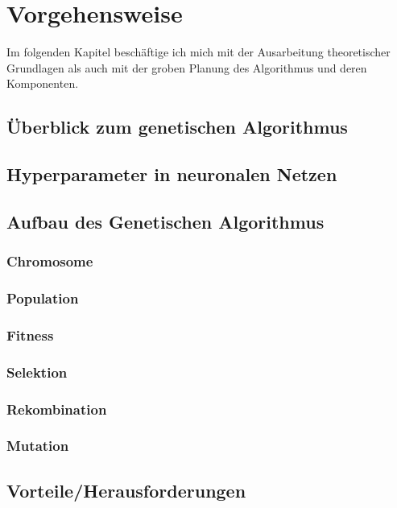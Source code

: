 \chapter{Vorgehensweise} 
Im folgenden Kapitel beschäftige ich mich mit der Ausarbeitung theoretischer Grundlagen als auch mit der groben Planung des Algorithmus und deren Komponenten.
\section{Überblick zum genetischen Algorithmus}
\section{Hyperparameter in neuronalen Netzen}
\section{Aufbau des Genetischen Algorithmus}
\subsection{Chromosome}
\subsection{Population}
\subsection{Fitness}
\subsection{Selektion}
\subsection{Rekombination}
\subsection{Mutation}
\section{Vorteile/Herausforderungen}